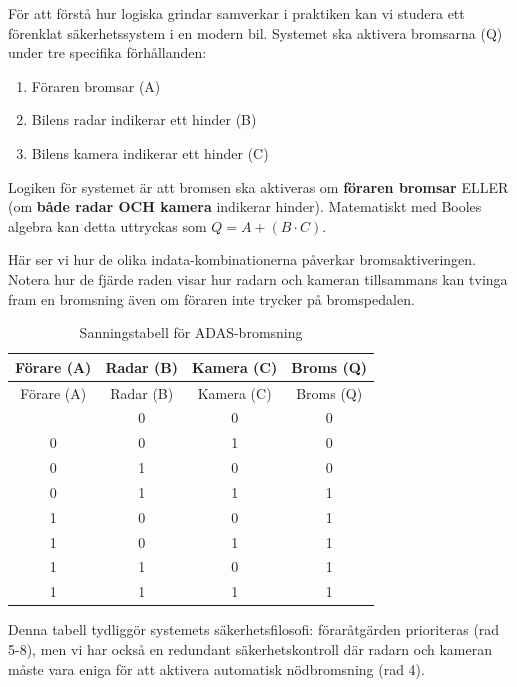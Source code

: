 \documentclass[
  swedish,
  letterpaper,
  oneside,
  openany]{book}
\providecommand{\tightlist}{%
  \setlength{\itemsep}{0pt}\setlength{\parskip}{0pt}}
\begin{document}
\begin{tcolorbox}[enhanced jigsaw, arc=.35mm, bottomrule=.15mm, bottomtitle=1mm, breakable, colback=white, colbacktitle=quarto-callout-note-color!10!white, colframe=quarto-callout-note-color-frame, coltitle=black, left=2mm, leftrule=.75mm, opacityback=0, opacitybacktitle=0.6, rightrule=.15mm, title=\textcolor{quarto-callout-note-color}{\faInfo}\hspace{0.5em}{Exempel: Logik i ett ADAS-system för fordon}, titlerule=0mm, toprule=.15mm, toptitle=1mm]

För att förstå hur logiska grindar samverkar i praktiken kan vi studera
ett förenklat säkerhetssystem i en modern bil. Systemet ska aktivera
bromsarna (Q) under tre specifika förhållanden:

\begin{enumerate}
\def\labelenumi{\arabic{enumi}.}
\tightlist
\item
  Föraren bromsar (A)
\item
  Bilens radar indikerar ett hinder (B)
\item
  Bilens kamera indikerar ett hinder (C)
\end{enumerate}

Logiken för systemet är att bromsen ska aktiveras om \textbf{föraren
bromsar} ELLER (om \textbf{både radar OCH kamera} indikerar hinder).
Matematiskt med Booles algebra kan detta uttryckas som
\(Q = A + (B \cdot C)\).

Här ser vi hur de olika indata-kombinationerna påverkar
bromsaktiveringen. Notera hur de fjärde raden visar hur radarn och
kameran tillsammans kan tvinga fram en bromsning även om föraren inte
trycker på bromspedalen.

\begin{longtable}[]{@{}cccc@{}}
\caption{Sanningstabell för
ADAS-bromsning}\label{tbl-adas}\tabularnewline
\toprule\noalign{}
Förare (A) & Radar (B) & Kamera (C) & Broms (Q) \\
\midrule\noalign{}
\endfirsthead
\toprule\noalign{}
Förare (A) & Radar (B) & Kamera (C) & Broms (Q) \\
\midrule\noalign{}
\endhead
\bottomrule\noalign{}
\endlastfoot
0 & 0 & 0 & 0 \\
0 & 0 & 1 & 0 \\
0 & 1 & 0 & 0 \\
0 & 1 & 1 & 1 \\
1 & 0 & 0 & 1 \\
1 & 0 & 1 & 1 \\
1 & 1 & 0 & 1 \\
1 & 1 & 1 & 1 \\
\end{longtable}

Denna tabell tydliggör systemets säkerhetsfilosofi: föraråtgärden
prioriteras (rad 5-8), men vi har också en redundant säkerhetskontroll
där radarn och kameran måste vara eniga för att aktivera automatisk
nödbromsning (rad 4).

\end{tcolorbox}
\end{document}
